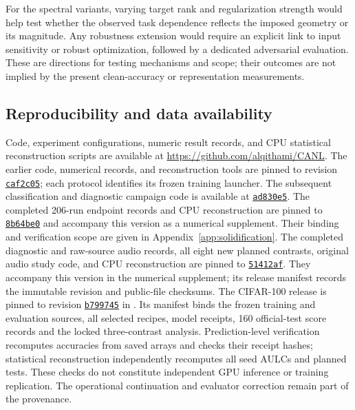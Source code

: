 \documentclass[10pt,a4paper,twocolumn]{article}
\begin{document}
For the spectral variants, varying target rank and regularization
strength would help test whether the observed task dependence reflects
the imposed geometry or its magnitude. Any robustness extension would
require an explicit link to input sensitivity or robust optimization,
followed by a dedicated adversarial evaluation. These are directions
for testing mechanisms and scope; their outcomes are not implied by
the present clean-accuracy or representation measurements.

\subsection{Reproducibility and data availability}
\label{sec:reproducibility}

Code, experiment configurations, numeric result records, and CPU statistical
reconstruction scripts are available at
\url{https://github.com/alqithami/CANL}.
The earlier code, numerical records, and reconstruction tools are pinned to revision
\href{https://github.com/alqithami/CANL/tree/caf2c0563ee4eeb502547cb235a18e924ab932b1}{\texttt{caf2c05}};
each protocol identifies its frozen training launcher.
The subsequent classification and diagnostic campaign code is available at
\href{https://github.com/alqithami/CANL/tree/ad830e59cb0f96ac2ded129de78a676e32b3cda7}{\texttt{ad830e5}}.
The completed 206-run endpoint records and CPU reconstruction are pinned to
\href{https://github.com/alqithami/CANL/tree/8b64be063e92d9ec94c1249ff791da262f755e68/results/caenl-solidification-v1}{\texttt{8b64be0}}
and accompany this version as a numerical supplement. Their binding
and verification scope are given in
Appendix~\ref{app:solidification}. The completed diagnostic and raw-source
 audio records, all eight new planned contrasts, original audio study
 code, and CPU reconstruction are pinned to
 \href{https://github.com/alqithami/CANL/tree/51412af5df877a8b87746bd7a8a9422192895132}{\texttt{51412af}}.
 They accompany this version in the numerical supplement; its release
 manifest records the immutable revision and public-file checksums.
The CIFAR-100 release is pinned to revision
\href{https://github.com/alqithami/CANL/tree/b7997451606151344a155625127ed15db956ada2/results/caenl-cifar100-focused-v1}{\texttt{b799745}}
in . Its manifest binds the frozen
training and evaluation sources, all selected recipes, model receipts,
160 official-test score records and the locked three-contrast analysis.
Prediction-level verification recomputes accuracies from saved arrays
and checks their receipt hashes; statistical reconstruction independently
recomputes all seed AULCs and planned tests. These checks do not constitute
independent GPU inference or training replication. The operational
continuation and evaluator correction remain part of the provenance.
\end{document}
